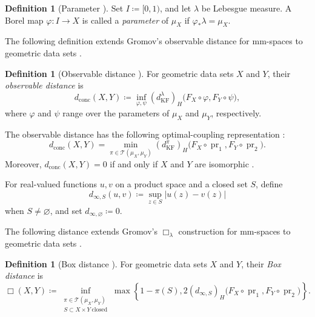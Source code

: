 \documentclass[11pt]{amsart}
\theoremstyle{plain}
\theoremstyle{definition}
\newtheorem{definition}[theorem]{Definition}
\theoremstyle{remark}
\newcommand{\T}{\mathcal T}
\newcommand{\dconc}{d_{\mathrm{conc}}}
\newcommand{\kf}{d_{\operatorname{KF}}}
\DeclareMathOperator{\pr}{pr}
\begin{document}
\begin{definition}[Parameter {\cite[Definition~4.1]{gds1}}]
\label{def:parameter}
Set $I\coloneqq[0,1)$, and let $\lambda$ be Lebesgue measure. A Borel map $\varphi\colon I\to X$ is called a \emph{parameter} of $\mu_X$ if $\varphi_*\lambda=\mu_X$.
\end{definition}

The following definition extends Gromov's observable distance for mm-spaces \cite[Definition~3\(\frac12\).45, p.~199]{gromov2007met} to geometric data sets \cite[Definition~4.2]{gds1}.

\begin{definition}[Observable distance {\cite[Definition~4.2]{gds1}}]
\label{def:dconc}
For geometric data sets $X$ and $Y$, their \emph{observable distance} is
\[\dconc(X,Y)\coloneqq\inf_{\varphi,\psi}(\kf^\lambda)_H\bigl(F_X\circ\varphi,F_Y\circ\psi\bigr),\]
where $\varphi$ and $\psi$ range over the parameters of $\mu_X$ and $\mu_Y$, respectively.
\end{definition}

The observable distance has the following optimal-coupling representation \cite[Theorem~4.6]{gds1}:
\begin{equation}
\label{eq:dconc-coupling}
\dconc(X,Y)=\min_{\pi\in\T(\mu_X,\mu_Y)}(\kf^\pi)_H\bigl(F_X\circ\pr_1,F_Y\circ\pr_2\bigr).
\end{equation}
Moreover, $\dconc(X,Y)=0$ if and only if $X$ and $Y$ are isomorphic \cite[Theorem~3.10]{hanika2022gds}.

For real-valued functions $u,v$ on a product space and a closed set $S$, define
\[d_{\infty,S}(u,v)\coloneqq\sup_{z\in S}|u(z)-v(z)|\]
when $S\neq\varnothing$, and set $d_{\infty,\varnothing}\coloneqq0$.

The following distance extends Gromov's $\Box_\lambda$ construction for mm-spaces \cite[Definitions~3\(\frac12\).2--3\(\frac12\).3, pp.~116--117]{gromov2007met} to geometric data sets \cite[Definition~5.7]{gds1}.

\begin{definition}[Box distance {\cite[Definition~5.7]{gds1}}]
\label{def:box}
For geometric data sets $X$ and $Y$, their \emph{Box distance} is
\begin{equation}
\label{eq:box-formula}
\Box(X,Y)\coloneqq\inf_{\substack{\pi\in\T(\mu_X,\mu_Y)\\S\subset X\times Y\ \mathrm{closed}}}\max\left\{1-\pi(S),2(d_{\infty,S})_H\bigl(F_X\circ\pr_1,F_Y\circ\pr_2\bigr)\right\}.
\end{equation}
\end{definition}
\end{document}

